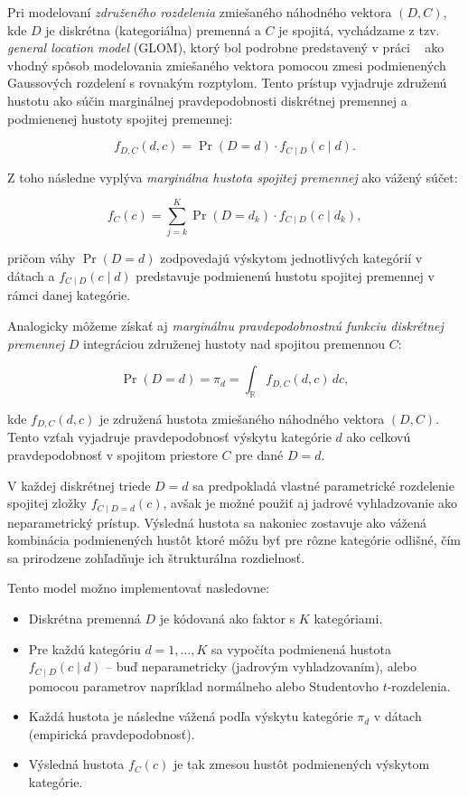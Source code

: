 Pri modelovaní \textit{združeného rozdelenia} zmiešaného náhodného vektora $(D, C)$, kde $D$ je diskrétna (kategoriálna) premenná a $C$ je spojitá, vychádzame z tzv. \textit{general location model} (GLOM), ktorý bol podrobne predstavený v práci ~\textcite{pleisMixtureDissertation} ako vhodný spôsob modelovania zmiešaného vektora pomocou zmesi podmienených Gaussových rozdelení s rovnakým rozptylom. Tento prístup vyjadruje združenú hustotu ako súčin marginálnej pravdepodobnosti diskrétnej premennej a podmienenej hustoty spojitej premennej:

\begin{equation}
f_{D,C}(d, c) = \Pr(D = d) \cdot f_{C \mid D}(c \mid d).
\end{equation}

Z toho následne vyplýva \textit{marginálna hustota spojitej premennej} ako vážený súčet:

\begin{equation}
f_C(c) = \sum_{j=k}^{K} \Pr(D = d_k) \cdot f_{C \mid D}(c \mid d_k),
\end{equation}

pričom váhy $\Pr(D = d)$ zodpovedajú výskytom jednotlivých kategórií v dátach a $f_{C \mid D}(c \mid d)$ predstavuje podmienenú hustotu spojitej premennej v rámci danej kategórie.

Analogicky môžeme získať aj \textit{marginálnu pravdepodobnostnú funkciu diskrétnej premennej} $D$ integráciou združenej hustoty nad spojitou premennou $C$:

\begin{equation}
\Pr(D = d) = \pi_d = \int_{\mathbb{R}} f_{D,C}(d, c) \, dc,
\end{equation}

kde $f_{D,C}(d, c)$ je združená hustota zmiešaného náhodného vektora $(D, C)$. Tento vzťah vyjadruje pravdepodobnosť výskytu kategórie $d$ ako celkovú pravdepodobnosť v spojitom priestore $C$ pre dané $D = d$.

V každej diskrétnej triede $D = d$ sa predpokladá vlastné parametrické rozdelenie spojitej zložky $f_{C \mid D=d}(c)$, avšak je možné použiť aj jadrové vyhladzovanie ako neparametrický prístup. Výsledná hustota sa nakoniec zostavuje ako vážená kombinácia podmienených hustôt ktoré môžu byť pre rôzne kategórie odlišné, čím sa prirodzene zohľadňuje ich štrukturálna rozdielnosť.

Tento model možno implementovať nasledovne:
\begin{itemize}
  \item Diskrétna premenná $D$ je kódovaná ako faktor s $K$ kategóriami.
  \item Pre každú kategóriu $d = 1, \dots, K$ sa vypočíta podmienená hustota $f_{C \mid D}(c \mid d)$ – buď neparametricky (jadrovým vyhladzovaním), alebo pomocou parametrov napríklad normálneho alebo Studentovho $t$-rozdelenia.
  \item Každá hustota je následne vážená podľa výskytu kategórie $\pi_d$ v dátach (empirická pravdepodobnosť).
  \item Výsledná hustota $f_C(c)$ je tak zmesou hustôt podmienených výskytom kategórie.
\end{itemize}

